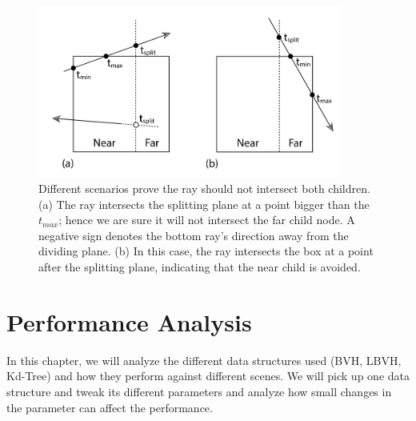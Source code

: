 \documentclass[11pt,a4paper]{article}
\begin{document}
\begin{figure}[H]	
     \centering
     \captionsetup{justification=centering,margin=2cm}
     \includegraphics[width=10cm]{images/kdtree/traversal_case.png}
     \caption{Different scenarios prove the ray should not intersect both children.(a) The ray intersects the splitting plane at a point bigger than the $t_{max}$; hence we are sure it will not intersect the far child node. A negative sign denotes the bottom ray's direction away from the dividing plane. (b) In this case, the ray intersects the box at a point after the splitting plane, indicating that the  near child is avoided. \protect\cite{Pharr2016}}
        \label{fig:dice}
\end{figure}


\clearpage

\section{Performance Analysis}
In this chapter, we will analyze the different data structures used (BVH, LBVH, Kd-Tree) and how they perform against different scenes. We will pick up one data structure and tweak its different parameters and analyze how small changes in the parameter can affect the performance.
\end{document}
